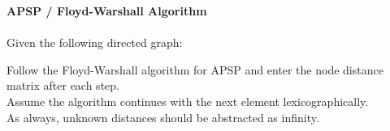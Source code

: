 \textbf{\LARGE{\color{tumgadRed}APSP / Floyd-Warshall Algorithm}}\\
\\
\noindent
Given the following directed graph:
\begin{center}
\end{center}
Follow the Floyd-Warshall algorithm for APSP and enter the node distance matrix after each step.\\
Assume the algorithm continues with the next element lexicographically.\\
As always, unknown distances should be abstracted as infinity.\\
\begin{center}
\end{center}
